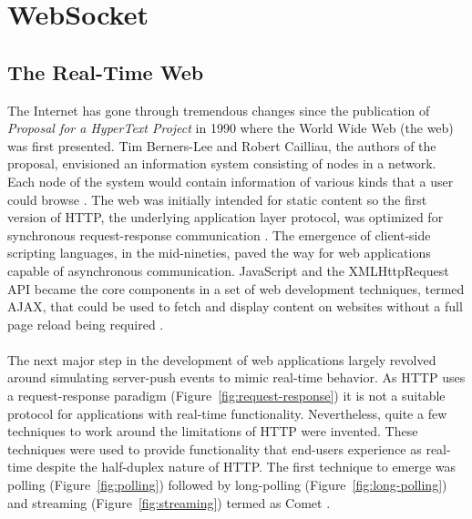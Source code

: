 \chapter{WebSocket}
\label{chapter:websocket}

\section{The Real-Time Web}

The Internet has gone through tremendous changes since the publication of \textit{Proposal for a HyperText Project} in 1990 where the World Wide Web (the web) was first presented. Tim Berners-Lee and Robert Cailliau, the authors of the proposal, envisioned an information system consisting of nodes in a network. Each node of the system would contain information of various kinds that a user could browse \cite{berners1990worldwideweb}. The web was initially intended for static content so the first version of HTTP, the underlying application layer protocol, was optimized for synchronous request-response communication \cite{berners1991original}. The emergence of client-side scripting languages, in the mid-nineties, paved the way for web applications capable of asynchronous communication. JavaScript and the XMLHttpRequest API became the core components in a set of web development techniques, termed AJAX, that could be used to fetch and display content on websites without a full page reload being required \cite{paulson2005building}.
\\ \\
The next major step in the development of web applications largely revolved around simulating server-push events to mimic real-time behavior. As HTTP uses a request-response paradigm (Figure~\ref{fig:request-response}) it is not a suitable protocol for applications with real-time functionality. Nevertheless, quite a few techniques to work around the limitations of HTTP were invented. These techniques were used to provide functionality that end-users experience as real-time despite the half-duplex nature of HTTP. The first technique to emerge was polling (Figure~\ref{fig:polling}) followed by long-polling (Figure~\ref{fig:long-polling}) and streaming (Figure~\ref{fig:streaming}) termed as Comet \cite{mccarthy2008comet}. 
\\
